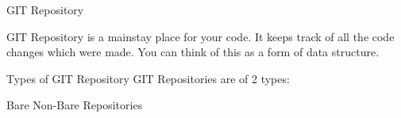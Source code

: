  GIT Repository

GIT Repository is a mainstay place for your code. It keeps track of all the code changes which were made. You can think of this as a form of data structure.

Types of GIT Repository
GIT Repositories are of 2 types:

Bare
Non-Bare Repositories
